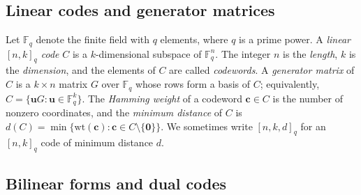 \documentclass[11pt]{article}
\theoremstyle{plain}
\theoremstyle{remark}
\newcommand{\F}{\mathbb{F}}
\begin{document}
\subsection{Linear codes and generator matrices}\label{sec:prelim-codes}

Let $\F_q$ denote the finite field with $q$ elements, where $q$ is a prime power.
A \emph{linear $[n, k]_q$ code} $C$ is a $k$-dimensional subspace of $\F_q^n$.
The integer $n$ is the \emph{length}, $k$ is the \emph{dimension}, and the elements of $C$
are called \emph{codewords}. A \emph{generator matrix} of $C$ is a $k \times n$ matrix
$G$ over $\F_q$ whose rows form a basis of $C$; equivalently, $C = \{\mathbf{u} G : \mathbf{u} \in \F_q^k\}$.
The \emph{Hamming weight} of a codeword $\mathbf{c} \in C$ is the number of nonzero coordinates,
and the \emph{minimum distance} of $C$ is $d(C) = \min\{\mathrm{wt}(\mathbf{c}) : \mathbf{c} \in C \setminus \{\mathbf{0}\}\}$.
We sometimes write $[n, k, d]_q$ for an $[n, k]_q$ code of minimum distance $d$.

\subsection{Bilinear forms and dual codes}\label{sec:prelim-dual}
\end{document}
